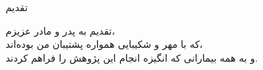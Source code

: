 \thispagestyle{empty}
\vspace*{\fill}
\begin{center}
  {\nastaliq\Large تقدیم}
\end{center}
\vspace{2em}

\begin{center}
  \begingroup \LARGE \nastaliq
  تقدیم به پدر و مادر عزیزم،\\[0.8em]
  که با مهر و شکیبایی همواره پشتیبان من بوده‌اند،\\[0.8em]
  و به همه بیمارانی که انگیزه انجام این پژوهش را فراهم کردند.
  \endgroup
\end{center}
\vspace*{\fill}
\clearpage
